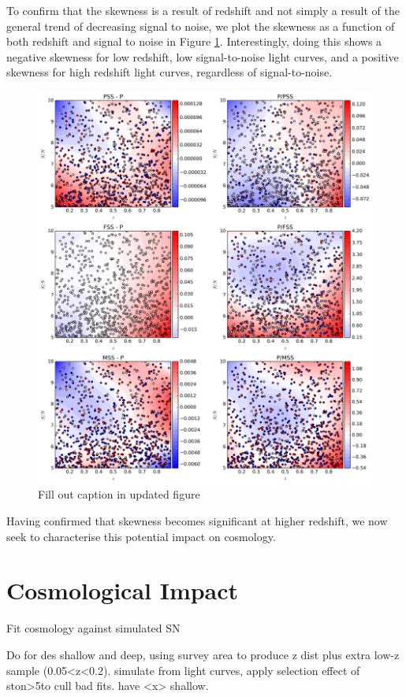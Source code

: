 \documentclass[a4paper,fleqn,usenatbib]{mnras}
\newcommand{\red}{\color{red}}
\begin{document}
To confirm that the skewness is a result of redshift and not simply a result of the general trend of decreasing signal to noise, we plot the skewness as a function of both redshift and signal to noise in Figure \ref{fig:bias_skew}. Interestingly, doing this shows a negative skewness for low redshift, low signal-to-noise light curves, and a positive skewness for high redshift light curves, regardless of signal-to-noise.
\begin{figure}
	\includegraphics[width=\textwidth]{../output/bias2.png}
	\caption{{\red Fill out caption in updated figure}}
	\label{fig:bias_skew}
\end{figure}
Having confirmed that skewness becomes significant at higher redshift, we now seek to characterise this potential impact on cosmology.


\section{Cosmological Impact}
\label{sec:cosmology}
Fit cosmology against simulated SN

Do for des shallow and deep, using survey area to produce z dist plus extra low-z sample (0.05<z<0.2). simulate from light curves, apply selection effect of ston>5to cull bad fits. have <x> shallow.
\end{document}
